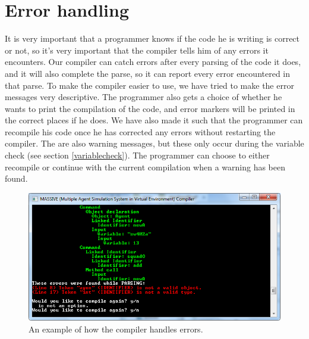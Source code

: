 \section{Error handling}
It is very important that a programmer knows if the code he is writing is correct or not, so it's very important that the compiler tells him of any errors it encounters. 
Our compiler can catch errors after every parsing of the code it does, and it will also complete the parse, so it can report every error encountered in that parse. \newline
To make the compiler easier to use, we have tried to make the error messages very descriptive. 
The programmer also gets a choice of whether he wants to print the compilation of the code, and error markers will be printed in the correct places if he does.
We have also made it such that the programmer can recompile his code once he has corrected any errors without restarting the compiler. \newline
The are also warning messages, but these only occur during the variable check (see section \ref{variablecheck}). 
The programmer can choose to either recompile or continue with the current compilation when a warning has been found.

\begin{figure}[H]
\begin{center}
\includegraphics[scale=0.5]{Images/errorhandling.png}
\end{center}
\caption{An example of how the compiler handles errors.}
\end{figure}